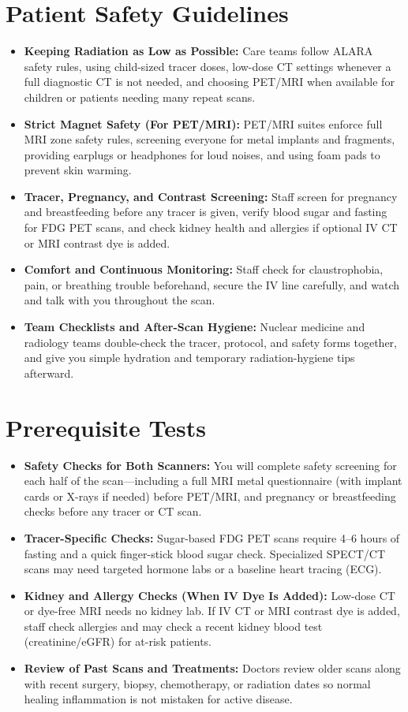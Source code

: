 \section{Patient Safety Guidelines}
\begin{itemize}
    \item \textbf{Keeping Radiation as Low as Possible:} Care teams follow ALARA safety rules, using child-sized tracer doses, low-dose CT settings whenever a full diagnostic CT is not needed, and choosing PET/MRI when available for children or patients needing many repeat scans.
    \item \textbf{Strict Magnet Safety (For PET/MRI):} PET/MRI suites enforce full MRI zone safety rules, screening everyone for metal implants and fragments, providing earplugs or headphones for loud noises, and using foam pads to prevent skin warming.
    \item \textbf{Tracer, Pregnancy, and Contrast Screening:} Staff screen for pregnancy and breastfeeding before any tracer is given, verify blood sugar and fasting for FDG PET scans, and check kidney health and allergies if optional IV CT or MRI contrast dye is added.
    \item \textbf{Comfort and Continuous Monitoring:} Staff check for claustrophobia, pain, or breathing trouble beforehand, secure the IV line carefully, and watch and talk with you throughout the scan.
    \item \textbf{Team Checklists and After-Scan Hygiene:} Nuclear medicine and radiology teams double-check the tracer, protocol, and safety forms together, and give you simple hydration and temporary radiation-hygiene tips afterward.
\end{itemize}

\section{Prerequisite Tests}
\begin{itemize}
    \item \textbf{Safety Checks for Both Scanners:} You will complete safety screening for each half of the scan---including a full MRI metal questionnaire (with implant cards or X-rays if needed) before PET/MRI, and pregnancy or breastfeeding checks before any tracer or CT scan.
    \item \textbf{Tracer-Specific Checks:} Sugar-based FDG PET scans require 4--6 hours of fasting and a quick finger-stick blood sugar check. Specialized SPECT/CT scans may need targeted hormone labs or a baseline heart tracing (ECG).
    \item \textbf{Kidney and Allergy Checks (When IV Dye Is Added):} Low-dose CT or dye-free MRI needs no kidney lab. If IV CT or MRI contrast dye is added, staff check allergies and may check a recent kidney blood test (creatinine/eGFR) for at-risk patients.
    \item \textbf{Review of Past Scans and Treatments:} Doctors review older scans along with recent surgery, biopsy, chemotherapy, or radiation dates so normal healing inflammation is not mistaken for active disease.
\end{itemize}

